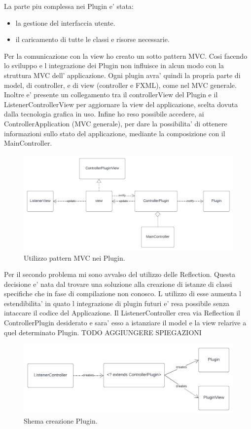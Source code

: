 \documentclass[a4paper,12pt]{report}
\begin{document}
%
La parte piu complessa nei Plugin e' stata:
\begin{itemize}
	\item la gestione del interfaccia utente.
	\item il caricamento di tutte le classi e risorse necessarie.
\end{itemize}
Per la comunicazione con la view ho creato un sotto pattern MVC. Cosi facendo lo sviluppo e l integrazione dei Plugin non influisce in alcun modo con
la struttura MVC dell' applicazione. Ogni plugin avra' quindi la propria parte di model, di controller, e di view (controller e FXML), come nel MVC generale. Inoltre e' presente un collegamento tra il controllerView del Plugin e il ListenerControllerView per aggiornare la view del applicazione, scelta dovuta dalla tecnologia grafica in uso. Infine ho reso possibile accedere, ai ControllerApplication (MVC generale), per dare la possibilita' di ottenere informazioni sullo stato del applicazione, mediante la composizione con il MainController.
\begin{figure}[H]
\centering{}
\includegraphics[width=\textwidth]{img/listener/PluginMVC.png}
\caption{Utilizzo pattern MVC nei Plugin.}
\label{img:Listener}
\end{figure}
%
Per il secondo problema mi sono avvalso del utilizzo delle Reflection. Questa decisione e' nata dal trovare una soluzione alla creazione di istanze di classi specifiche che in fase di compilazione non conosco. L utilizzo di esse aumenta l estendibilita' in quato l integrazione di plugin futuri e' resa possibile senza intaccare il codice del Applicazione. Il ListenerController crea via Reflection il ControllerPlugin desiderato e sara' esso a istanziare il model e la view relarive a quel determinato Plugin. TODO AGGIUNGERE SPIEGAZIONI 
\begin{figure}[H]
\centering{}
\includegraphics[width=\textwidth]{img/listener/PluginCreates.png}
\caption{Shema creazione Plugin.}
\label{img:Listener}
\end{figure}
\end{document}
